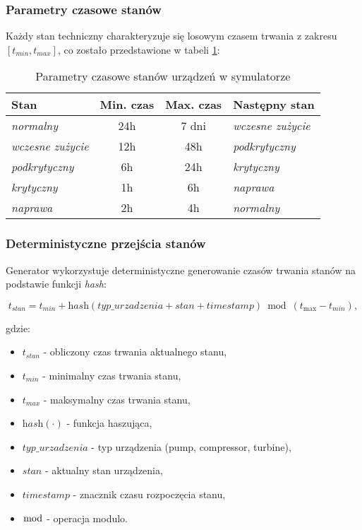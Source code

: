 \subsubsection{Parametry czasowe stanów}

Każdy stan techniczny charakteryzuje się losowym czasem trwania z zakresu $[t_{min}, t_{max}]$, co zostało przedstawione w tabeli \ref{tab:parametry_stanow_sim}:

\begin{table}[h]
\centering
\begin{tabular}{|l|c|c|l|}
\hline
\textbf{Stan} & \textbf{Min. czas} & \textbf{Max. czas} & \textbf{Następny stan} \\
\hline
\textit{normalny} & 24h & 7 dni & \textit{wczesne zużycie} \\
\textit{wczesne zużycie} & 12h & 48h & \textit{podkrytyczny} \\
\textit{podkrytyczny} & 6h & 24h & \textit{krytyczny} \\
\textit{krytyczny} & 1h & 6h & \textit{naprawa} \\
\textit{naprawa} & 2h & 4h & \textit{normalny} \\
\hline
\end{tabular}
\caption{Parametry czasowe stanów urządzeń w symulatorze}
\label{tab:parametry_stanow_sim}
\end{table}

\newpage

\subsubsection{Deterministyczne przejścia stanów}

Generator wykorzystuje deterministyczne generowanie czasów trwania stanów na podstawie funkcji \textit{hash}:

\begin{equation}
t_{stan} = t_{min} + \textit{hash}(typ\_urzadzenia + stan + timestamp) \bmod (t_{\text{max}} - t_{min}),
\end{equation}

gdzie:
\begin{itemize}
    \item $t_{stan}$ - obliczony czas trwania aktualnego stanu,
    \item $t_{min}$ - minimalny czas trwania stanu,
    \item $t_{max}$ - maksymalny czas trwania stanu,
    \item $\textit{hash}(\cdot)$ - funkcja haszująca,
    \item $typ\_urzadzenia$ - typ urządzenia (pump, compressor, turbine),
    \item $stan$ - aktualny stan urządzenia,
    \item $timestamp$ - znacznik czasu rozpoczęcia stanu,
    \item $\bmod$ - operacja modulo.
\end{itemize}

